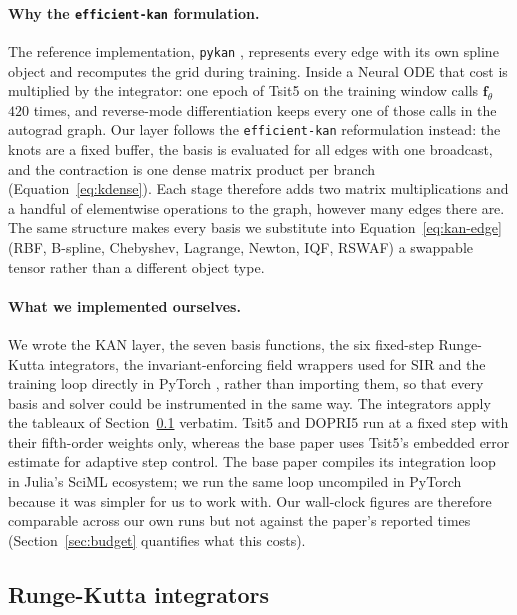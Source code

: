 \paragraph{Why the \texttt{efficient-kan} formulation.} The reference
implementation, \texttt{pykan} \cite{liu2024kan}, represents every edge with
its own spline object and recomputes the grid during training. Inside a
Neural ODE that cost is multiplied by the integrator: one epoch of Tsit5 on
the training window calls $\mathbf{f}_\theta$ $420$ times, and reverse-mode
differentiation keeps every one of those calls in the autograd graph. Our
layer follows the \texttt{efficient-kan} reformulation
\cite{blealtan2024efficientkan} instead: the knots are a fixed buffer, the
basis is evaluated for all edges with one broadcast, and the contraction is
one dense matrix product per branch (Equation~\ref{eq:kdense}). Each stage
therefore adds two matrix multiplications and a handful of elementwise
operations to the graph, however many edges there are. The same structure
makes every basis we substitute into Equation~\ref{eq:kan-edge} (RBF,
B-spline, Chebyshev, Lagrange, Newton, IQF, RSWAF) a swappable tensor rather
than a different object type.

\paragraph{What we implemented ourselves.} We wrote the KAN layer, the seven
basis functions, the six fixed-step Runge-Kutta integrators, the
invariant-enforcing field wrappers used for SIR and the training loop
directly in PyTorch \cite{paszke2019pytorch}, rather than importing them, so
that every basis and solver could be instrumented in the same way. The
integrators apply the tableaux of Section~\ref{sec:integrators} verbatim.
Tsit5 and DOPRI5 run at a fixed step with their fifth-order weights only,
whereas the base paper uses Tsit5's embedded error estimate for adaptive
step control. The base paper compiles its integration loop in Julia's SciML
ecosystem; we run the same loop uncompiled in PyTorch because it was simpler
for us to work with. Our wall-clock figures are therefore comparable across
our own runs but not against the paper's reported times
(Section~\ref{sec:budget} quantifies what this costs).

\subsection{Runge-Kutta integrators}
\label{sec:integrators}

